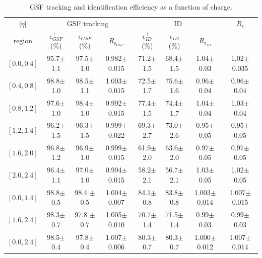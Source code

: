 \begin{table}[htbp]
\begin{center}
\begin{sideways}
\begin{tabular}{cccccccc}
    \toprule
$|\eta|$  & \multicolumn{3}{c}{GSF tracking } & \multicolumn{3}{c}{ID } & $R_\epsilon$ \\
region    & $\epsilon_{GSF}^+$ (\%) &$\epsilon_{GSF}^-$ (\%) & $R_{\epsilon_{GSF}}$ 
                                              & $\epsilon_{ID}^+$ (\%) &$\epsilon_{ID}^-$ (\%) & $R_{\epsilon_{ID}}$ &  \\
\midrule
$\left[ 0.0,0.4 \right]$ & 95.7$\pm$1.1 & 97.5$\pm$1.0 & 0.982$\pm$0.015 & 71.2$\pm$1.5 & 68.4$\pm$1.5 & 1.04$\pm$0.03 &1.02$\pm$0.035  \\
$\left[ 0.4,0.8 \right]$ & 98.8$\pm$ 1.0& 98.5$\pm$1.1 & 1.003$\pm$0.015 & 72.5$\pm$1.7 & 75.6$\pm$1.6 & 0.96$\pm$0.04 &0.96$\pm$ 0.04 \\
$\left[ 0.8,1.2 \right]$ & 97.6$\pm$ 1.0& 98.4$\pm$1.0 & 0.992$\pm$0.015 & 77.4$\pm$1.5 & 74.4$\pm$1.7 & 1.04$\pm$0.04 &1.03$\pm$ 0.04 \\
$\left[ 1.2,1.4 \right]$ & 96.2$\pm$ 1.5& 96.3$\pm$1.5 & 0.999$\pm$0.022 & 69.3$\pm$2.7 & 73.0$\pm$2.6 & 0.95$\pm$0.05 &0.95$\pm$0.05  \\
$\left[ 1.6,2.0 \right]$ & 96.8$\pm$ 1.2& 96.9$\pm$1.0 & 0.999$\pm$0.015 & 61.9$\pm$2.0 & 63.6$\pm$2.0 & 0.97$\pm$0.05 &0.97$\pm$0.05  \\
$\left[ 2.0,2.4 \right]$ & 96.4$\pm$ 1.1& 97.0$\pm$1.0 & 0.994$\pm$0.015 & 58.2$\pm$2.1 & 56.7$\pm$2.1 & 1.03$\pm$0.05 &1.02$\pm$0.05  \\
\midrule
$\left[ 0.0,1.4 \right]$ & 98.8$\pm$0.5 & 98.4 $\pm$0.5 & 1.004$\pm$0.007 & 84.1$\pm$0.8 & 83.8$\pm$0.8 & 1.003$\pm$0.014 & 1.007$\pm$ 0.015 \\
$\left[ 1.6,2.4 \right]$ & 98.3$\pm$0.7 & 97.8 $\pm$0.7 & 1.005$\pm$0.010 & 70.7$\pm$1.4 & 71.5$\pm$1.4 & 0.99$\pm$0.03 &0.99$\pm$ 0.03 \\
\midrule 
$\left[ 0.0,2.4 \right]$ & 98.5$\pm$0.4 & 97.8$\pm$0.4 & 1.007$\pm$0.006 & 80.3$\pm$0.7 & 80.3$\pm$0.7 & 1.000$\pm$0.012 &1.007$\pm$0.014  \\
    \bottomrule
\end{tabular}
\end{sideways}
\end{center}
\caption{ GSF tracking and identification efficiency as a function of charge.}
\label{tab:tagprobe}
\end{table}

